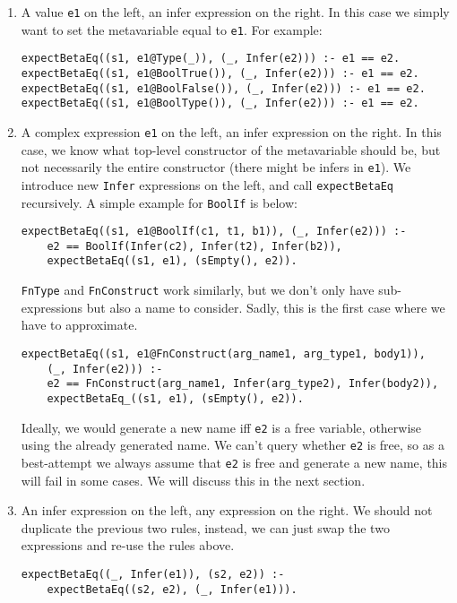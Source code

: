 \begin{enumerate}
	\item A value \verb|e1| on the left, an infer expression on the right. In this case we simply want to set the metavariable equal to \verb|e1|. For example:
	\begin{lstlisting}
expectBetaEq((s1, e1@Type(_)), (_, Infer(e2))) :- e1 == e2.
expectBetaEq((s1, e1@BoolTrue()), (_, Infer(e2))) :- e1 == e2.
expectBetaEq((s1, e1@BoolFalse()), (_, Infer(e2))) :- e1 == e2.
expectBetaEq((s1, e1@BoolType()), (_, Infer(e2))) :- e1 == e2.
	\end{lstlisting}

	\item A complex expression \verb|e1| on the left, an infer expression on the right. In this case, we know what top-level constructor of the metavariable should be, but not necessarily the entire constructor (there might be infers in \verb|e1|). We introduce new \verb|Infer| expressions on the left, and call \verb|expectBetaEq| recursively. A simple example for \verb|BoolIf| is below:
	\begin{lstlisting}
expectBetaEq((s1, e1@BoolIf(c1, t1, b1)), (_, Infer(e2))) :-
	e2 == BoolIf(Infer(c2), Infer(t2), Infer(b2)),
	expectBetaEq((s1, e1), (sEmpty(), e2)).
	\end{lstlisting}
	\verb|FnType| and \verb|FnConstruct| work similarly, but we don't only have sub-expressions but also a name to consider. Sadly, this is the first case where we have to approximate. 
	\begin{lstlisting}
expectBetaEq((s1, e1@FnConstruct(arg_name1, arg_type1, body1)), 
	(_, Infer(e2))) :-
	e2 == FnConstruct(arg_name1, Infer(arg_type2), Infer(body2)),
	expectBetaEq_((s1, e1), (sEmpty(), e2)).
	\end{lstlisting}
	\label{inf-case2}
	Ideally, we would generate a new name iff \verb|e2| is a free variable, otherwise using the already generated name. We can't query whether \verb|e2| is free, so as a best-attempt we always assume that \verb|e2| is free and generate a new name, this will fail in some cases. We will discuss this in the next section.
	
	\item An infer expression on the left, any expression on the right. We should not duplicate the previous two rules, instead, we can just swap the two expressions and re-use the rules above.
\begin{lstlisting}
expectBetaEq((_, Infer(e1)), (s2, e2)) :-
	expectBetaEq((s2, e2), (_, Infer(e1))).
\end{lstlisting}


\end{enumerate}
